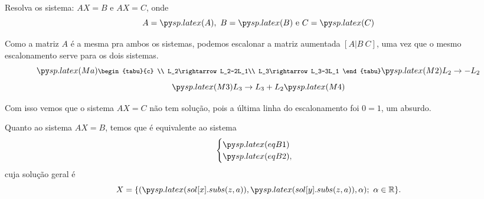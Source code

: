 \question
Resolva os sistema: $AX=B$ e $AX=C$, onde 
\[A=\pyl{A},\ B=\pyl{B} \text{ e } C=\pyl{C}\]

\begin{solution}
Como a matriz $A$ é a mesma pra ambos os sistemas, podemos escalonar a matriz aumentada $[A\vert B\ C]$, uma vez que o mesmo escalonamento serve para os dois sistemas.
\[\pyl{Ma} 
{\footnotesize \begin{tabu}{c}
\\
L_2\rightarrow L_2-2L_1\\
L_3\rightarrow L_3-3L_1
\end{tabu} }
 \pyl{M2}
{\footnotesize L_2\rightarrow -L_2}
\]
\[
\pyl{M3}
{\footnotesize L_3\rightarrow L_3+L_2}
\pyl{M4}
\]

Com isso vemos que o sistema $AX=C$ não tem solução, pois a última linha do escalonamento foi $0=1$, um absurdo. 

Quanto ao sistema $AX=B$, temos que é equivalente ao sistema
\[\begin{cases}
\pyl{eqB1}\\
\pyl{eqB2}, 
\end{cases}\]
cuja solução geral é 
\[X=\{(\pyl{sol[x].subs(z,a)},\pyl{sol[y].subs(z,a)},\alpha);\ \alpha\in \R \}.\]
\end{solution}



